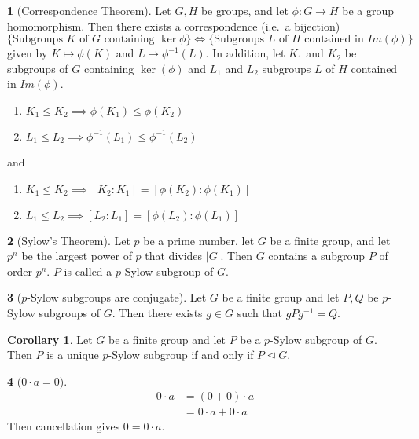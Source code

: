 \documentclass[12pt]{article}
\theoremstyle{definition}
\newtheorem{theorem}{\color{ForestGreen}{\textbf{Theorem}}}
\newtheorem{corollary}{Corollary}
\begin{document}
\begin{theorem}[Correspondence Theorem]
Let $G, H$ be groups, and let $\phi : G \to H$ be a group homomorphism. Then there exists a correspondence (i.e.\ a bijection)
\begin{equation*}
\{\text{Subgroups $K$ of $G$ containing $\ker \phi$}\} \iff \{\text{Subgroups $L$ of $H$ contained in $Im(\phi)$}\}
\end{equation*}
given by $K \mapsto \phi(K)$ and $L \mapsto \phi^{-1}(L)$. In addition, let $K_1$ and $K_2$ be subgroups of $G$ containing $\ker(\phi)$ and $L_1$ and $L_2$ subgroups $L$ of $H$ contained in $Im(\phi)$.
\begin{enumerate}
\item $K_1 \leq K_2 \implies \phi(K_1) \leq \phi(K_2)$
\item $L_1 \leq L_2 \implies \phi^{-1}(L_1) \leq \phi^{-1}(L_2)$
\end{enumerate}
and
\begin{enumerate}
\item $K_1 \leq K_2 \implies [K_2 : K_1] = [\phi(K_2) : \phi(K_1)]$
\item $L_1 \leq L_2 \implies [L_2 : L_1] = [\phi(L_2) : \phi(L_1)]$
\end{enumerate}
\end{theorem}

\begin{theorem}[Sylow's Theorem]
Let $p$ be a prime number, let $G$ be a finite group, and let $p^n$ be the largest power of $p$ that divides $
|G|$. Then $G$ contains a subgroup $P$ of order $p^n$. $P$ is called a $p$-Sylow subgroup of $G$.
\end{theorem}

\begin{theorem}[$p$-Sylow subgroups are conjugate]
Let $G$ be a finite group and let $P,Q$ be $p$-Sylow subgroups of $G$. Then there exists $g \in G$ such that $gPg^{-1} = Q$.
\end{theorem}

\begin{corollary}
Let $G$ be a finite group and let $P$ be a $p$-Sylow subgroup of $G$. Then $P$ is a unique $p$-Sylow subgroup if and only if $P \trianglelefteq G$.
\end{corollary}

\begin{theorem}[$0\cdot a = 0$]
\begin{align*}
0 \cdot a &= (0 + 0) \cdot a \tag{$0$ additive identity}\\
&= 0\cdot a + 0 \cdot a \tag{distributivity}
\end{align*}
Then cancellation gives $0 = 0 \cdot a$.
\end{theorem}
\end{document}
